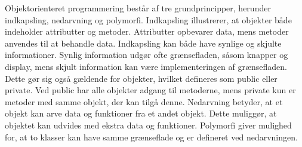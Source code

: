 \noindent
Objektorienteret programmering består af tre grundprincipper, herunder indkapsling, nedarvning og polymorfi. Indkapsling illustrerer, at objekter både indeholder attributter og metoder. Attributter opbevarer data, mens metoder anvendes til at behandle data. Indkapsling kan både have synlige og skjulte informationer. Synlig information udgør ofte grænsefladen, såsom knapper og display, mens skjult information kan være implementeringen af grænsefladen. Dette gør sig også gældende for objekter, hvilket defineres som public eller private. Ved public har alle objekter adgang til metoderne, mens private kun er metoder med samme objekt, der kan tilgå denne. Nedarvning betyder, at et objekt kan arve data og funktioner fra et andet objekt. Dette muliggør, at objektet kan udvides med ekstra data og funktioner. Polymorfi giver mulighed for, at to klasser kan have samme grænseflade og er defineret ved nedarvningen.\cite{Stefanov2013}
